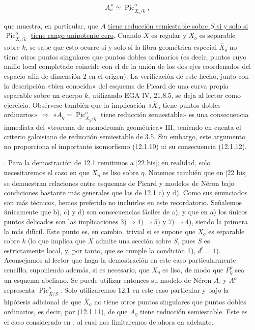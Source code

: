 \begin{equation}\tag{12.1.12}
 A_o^{\,o}\simeq\underline{\operatorname{Pic}}^o_{X_o/k},
\end{equation}

\noindent
que muestra, en particular, que $A$ \underline{tiene reducción
semiestable sobre $S$ si y solo si}
$\underline{\operatorname{Pic}}^o_{X_o/k}$ \underline{tiene rango
unipotente cero}. Cuando $X$ es regular y $X_o$ es separable sobre $k$,
se sabe que esto ocurre si y solo si la fibra geométrica especial
$\overline X_o$ no tiene otros puntos singulares que puntos dobles
ordinarios (es decir, puntos cuyo anillo local completado coincide con el
de la unión de los dos ejes coordenados del espacio afín de dimensión
$2$ en el origen). La verificación de este hecho, junto con la
descripción «bien conocida» del esquema de Picard de una curva propia
separable sobre un cuerpo $k$, utilizando EGA IV, 21.8.5, se deja al
lector como ejercicio. Obsérvese también que la implicación
«$\overline X_o$ tiene puntos dobles ordinarios» $\Longrightarrow$
«$A_\eta=\underline{\operatorname{Pic}}^o_{X_\eta/\eta}$ tiene reducción
semiestable» es una consecuencia inmediata del «teorema de monodromía
geométrica» III\sisi{\hspace{3.5em}}{}, teniendo en cuenta el criterio
galoisiano de reducción semiestable de 3.5. Sin embargo, este argumento
no proporciona el importante isomorfismo (12.1.10) ni su consecuencia
(12.1.12).


\medskip
{}. Para la demostración de 12.1 remitimos a [22 bis]; en realidad,
solo necesitaremos el caso en que $X_\eta$ es liso sobre $\eta$. Notemos
también que en [22 bis] se demuestran relaciones entre esquemas de Picard
y modelos de Néron bajo condiciones bastante más generales que las de
12.1 c) y d). Como sus enunciados son más técnicos, hemos preferido no
incluirlos en este recordatorio. Señalemos únicamente que b), c) y d) son
consecuencias fáciles de a), y que en a) los únicos puntos delicados son
las implicaciones $3)\Longrightarrow4)\Longrightarrow5)$ y
$7)\Longrightarrow4)$, siendo la primera la más difícil. Este punto es,
en cambio, trivial si se supone que $X_o$ es separable sobre $k$ (lo que
implica que $X$ admite una sección sobre $S$, pues $S$ es estrictamente
local, y, por tanto, que se cumple la condición 1), $d^t=1$). Aconsejamos
al lector que haga la demostración en este caso particularmente sencillo,
suponiendo además, si es necesario, que $X_\eta$ es liso, de modo que
$P_\eta^o$ sea un esquema abeliano. Se puede utilizar entonces su modelo
de Néron $A$, y $A^o$ representa
$\underline{\operatorname{Pic}}^o_{X/S}$. Solo utilizaremos 12.1 en este
caso particular y bajo la hipótesis adicional de que $\overline X_o$ no
tiene otros puntos singulares que puntos dobles ordinarios, es decir, por
(12.1.11), de que $A_\eta$ tiene reducción semiestable. Este es el caso
considerado en , al cual nos limitaremos de ahora en adelante.
